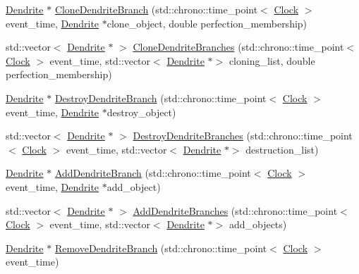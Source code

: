 \begin{DoxyCompactItemize}
\mbox{\hyperlink{class_dendrite}{Dendrite}} $\ast$ \mbox{\hyperlink{class_dendrite_ab682ffb9bfd1a1da1623e6b641471068}{Clone\+Dendrite\+Branch}} (std\+::chrono\+::time\+\_\+point$<$ \mbox{\hyperlink{universe_8h_a0ef8d951d1ca5ab3cfaf7ab4c7a6fd80}{Clock}} $>$ event\+\_\+time, \mbox{\hyperlink{class_dendrite}{Dendrite}} $\ast$clone\+\_\+object, double perfection\+\_\+membership)
\item 
std\+::vector$<$ \mbox{\hyperlink{class_dendrite}{Dendrite}} $\ast$ $>$ \mbox{\hyperlink{class_dendrite_abd67c09df69c520e6720bca2592bcc99}{Clone\+Dendrite\+Branches}} (std\+::chrono\+::time\+\_\+point$<$ \mbox{\hyperlink{universe_8h_a0ef8d951d1ca5ab3cfaf7ab4c7a6fd80}{Clock}} $>$ event\+\_\+time, std\+::vector$<$ \mbox{\hyperlink{class_dendrite}{Dendrite}} $\ast$$>$ cloning\+\_\+list, double perfection\+\_\+membership)
\item 
\mbox{\hyperlink{class_dendrite}{Dendrite}} $\ast$ \mbox{\hyperlink{class_dendrite_a87887a43ac38e762255da18eaaee43f5}{Destroy\+Dendrite\+Branch}} (std\+::chrono\+::time\+\_\+point$<$ \mbox{\hyperlink{universe_8h_a0ef8d951d1ca5ab3cfaf7ab4c7a6fd80}{Clock}} $>$ event\+\_\+time, \mbox{\hyperlink{class_dendrite}{Dendrite}} $\ast$destroy\+\_\+object)
\item 
std\+::vector$<$ \mbox{\hyperlink{class_dendrite}{Dendrite}} $\ast$ $>$ \mbox{\hyperlink{class_dendrite_a92c08afc374068922e462c9b65cf9157}{Destroy\+Dendrite\+Branches}} (std\+::chrono\+::time\+\_\+point$<$ \mbox{\hyperlink{universe_8h_a0ef8d951d1ca5ab3cfaf7ab4c7a6fd80}{Clock}} $>$ event\+\_\+time, std\+::vector$<$ \mbox{\hyperlink{class_dendrite}{Dendrite}} $\ast$$>$ destruction\+\_\+list)
\item 
\mbox{\hyperlink{class_dendrite}{Dendrite}} $\ast$ \mbox{\hyperlink{class_dendrite_aab6cedff35cb8c65923b14c8034cccc0}{Add\+Dendrite\+Branch}} (std\+::chrono\+::time\+\_\+point$<$ \mbox{\hyperlink{universe_8h_a0ef8d951d1ca5ab3cfaf7ab4c7a6fd80}{Clock}} $>$ event\+\_\+time, \mbox{\hyperlink{class_dendrite}{Dendrite}} $\ast$add\+\_\+object)
\item 
std\+::vector$<$ \mbox{\hyperlink{class_dendrite}{Dendrite}} $\ast$ $>$ \mbox{\hyperlink{class_dendrite_a3e6a80da180b60290545cfc92f221a05}{Add\+Dendrite\+Branches}} (std\+::chrono\+::time\+\_\+point$<$ \mbox{\hyperlink{universe_8h_a0ef8d951d1ca5ab3cfaf7ab4c7a6fd80}{Clock}} $>$ event\+\_\+time, std\+::vector$<$ \mbox{\hyperlink{class_dendrite}{Dendrite}} $\ast$$>$ add\+\_\+objects)
\item 
\mbox{\hyperlink{class_dendrite}{Dendrite}} $\ast$ \mbox{\hyperlink{class_dendrite_aa23bd0ce7c5a0a9011b28234cc2e90e1}{Remove\+Dendrite\+Branch}} (std\+::chrono\+::time\+\_\+point$<$ \mbox{\hyperlink{universe_8h_a0ef8d951d1ca5ab3cfaf7ab4c7a6fd80}{Clock}} $>$ event\+\_\+time)
$$
\end{DoxyCompactItemize}
